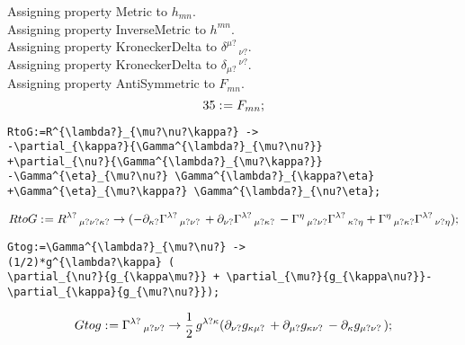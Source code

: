 \documentclass[11pt]{article}
\def\specialcolon{\mathrel{\mathop{:}}\hspace{-.5em}}
\begin{document}
Assigning property Metric to ${h}_{m n}$.
\\
Assigning property InverseMetric to ${h}^{m n}$.
\\
Assigning property KroneckerDelta to ${\delta}^{\mu?}\,_{\nu?}$.
\\
Assigning property KroneckerDelta to ${\delta}_{\mu?}\,^{\nu?}$.
\\
Assigning property AntiSymmetric to ${F}_{m n}$.
\\
\begin{dmath*}[compact, spread=2pt]
35\specialcolon{}= {F}_{m n};
\end{dmath*}
{\color[named]{Blue}\begin{verbatim}
RtoG:=R^{\lambda?}_{\mu?\nu?\kappa?} ->
-\partial_{\kappa?}{\Gamma^{\lambda?}_{\mu?\nu?}}
+\partial_{\nu?}{\Gamma^{\lambda?}_{\mu?\kappa?}}
-\Gamma^{\eta}_{\mu?\nu?} \Gamma^{\lambda?}_{\kappa?\eta}
+\Gamma^{\eta}_{\mu?\kappa?} \Gamma^{\lambda?}_{\nu?\eta};
\end{verbatim}}
\begin{dmath*}[compact, spread=2pt]
RtoG\specialcolon{}= {R}^{\lambda?}\,_{\mu? \nu? \kappa?} \rightarrow ( - {\partial}_{\kappa?}{{\Gamma}^{\lambda?}\,_{\mu? \nu?}}\,  + {\partial}_{\nu?}{{\Gamma}^{\lambda?}\,_{\mu? \kappa?}}\,  - {\Gamma}^{\eta}\,_{\mu? \nu?} {\Gamma}^{\lambda?}\,_{\kappa? \eta} + {\Gamma}^{\eta}\,_{\mu? \kappa?} {\Gamma}^{\lambda?}\,_{\nu? \eta});
\end{dmath*}
{\color[named]{Blue}\begin{verbatim}
Gtog:=\Gamma^{\lambda?}_{\mu?\nu?} ->
(1/2)*g^{\lambda?\kappa} (
\partial_{\nu?}{g_{\kappa\mu?}} + \partial_{\mu?}{g_{\kappa\nu?}}-\partial_{\kappa}{g_{\mu?\nu?}});
\end{verbatim}}
\begin{dmath*}[compact, spread=2pt]
Gtog\specialcolon{}= {\Gamma}^{\lambda?}\,_{\mu? \nu?} \rightarrow \frac{1}{2}\, {g}^{\lambda? \kappa} ({\partial}_{\nu?}{{g}_{\kappa \mu?}}\,  + {\partial}_{\mu?}{{g}_{\kappa \nu?}}\,  - {\partial}_{\kappa}{{g}_{\mu? \nu?}}\, );
\end{dmath*}
\end{document}
